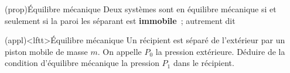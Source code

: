 \documentclass[../../main/main.tex]{subfiles}
\begin{document}
\begin{tcb*}(prop){Équilibre mécanique}
	Deux systèmes sont en équilibre mécanique si et seulement si la paroi les
	séparant est \textbf{immobile}~; autrement dit
	\psw{%
		\[
			\boxed{\sum_i \Ff_{\ext,i}\sup{paroi} = \of}
		\]
	}%
\end{tcb*}

\begin{tcb*}[breakable](appl)<lftt>{Équilibre mécanique}
	Un récipient est séparé de l'extérieur par un piston mobile de masse $m$. On
	appelle $P_0$ la pression extérieure. Déduire de la condition d'équilibre
	mécanique la pression $P_1$ dans le récipient.
	\tcblower
	\noindent
	\begin{minipage}[c]{.78\linewidth}
	\end{minipage}
	\hfill
	\begin{minipage}[c]{.18\linewidth}
		\vspace{0pt}
		\begin{center}
			\sswitch{
}
\end{center}
\end{minipage}
\end{tcb*}
\end{document}
